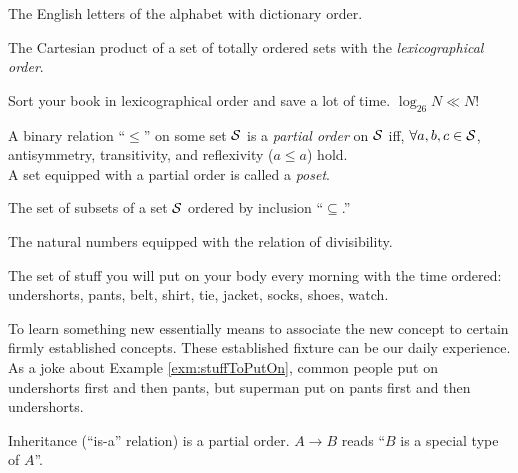 \begin{exm}
  The English letters of the alphabet with dictionary order.
\end{exm}

\begin{exm}
  The Cartesian product of a set of totally ordered sets
  with the \emph{lexicographical order}.
\end{exm}

\begin{exm}
  Sort your book in lexicographical order
  and save a lot of time.
  $\log_{26}N \ll N$!
\end{exm}

\begin{defn}
  \label{def:partialOrderAndPoset}
  A binary relation ``$\le$'' on some set ${\cal S}$
  is a \emph{partial order} on ${\cal S}$
  iff, $\forall a,b,c\in{\cal S}$,
  antisymmetry, transitivity, and reflexivity ($a\le a$)
  hold.\\
  A set equipped with a partial order
  is called a \emph{poset}.
\end{defn}

\begin{exm}
  The set of subsets of a set ${\cal S}$
  ordered by inclusion ``$\subseteq$.''
\end{exm}

\begin{exm}
  The natural numbers equipped with the relation of divisibility.
\end{exm}

\begin{exm}
  \label{exm:stuffToPutOn}
  The set of stuff you will put on your body every morning
  with the time ordered:
  undershorts, pants, belt, shirt, tie, jacket,
  socks, shoes, watch.
\end{exm}

\begin{rem}
  To learn something new essentially means
  to associate the new concept to certain firmly established concepts.
  These established fixture can be our daily experience.
  As a joke about Example \ref{exm:stuffToPutOn},
  common people put on undershorts first and then pants,
  but superman put on pants first and then undershorts.
\end{rem}

\begin{exm}
   \label{exm:inheritance}
  Inheritance (``is-a'' relation) is a partial order.
  $A \rightarrow B$ reads ``$B$ is a special type of $A$''.
\end{exm}

